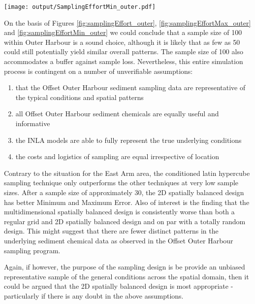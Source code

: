 \documentclass[a4paper]{article}
\let\origfigure=\figure
\let\endorigfigure=\endfigure
\renewenvironment{figure}[1][]{%
   \origfigure[H]
}{%
   \endorigfigure
}
\begin{document}
\begin{figure}
\centering\scriptsize\scriptsize
\texttt{[image: output/SamplingEffortMin\_outer.pdf]}
\caption{Comparison of the minimum Error conditional on sample size and
sampling method for the Outer
Harbour\label{fig:samplingEffortMin_outer}}
\end{figure}

On the basis of Figures \ref{fig:samplingEffort_outer},
\ref{fig:samplingEffortMax_outer} and \ref{fig:samplingEffortMin_outer}
we could conclude that a sample size of 100 within Outer Harbour is a
sound choice, although it is likely that as few as 50 could still
potentially yield similar overall patterns. The sample size of 100 also
accommodates a buffer against sample loss. Nevertheless, this entire
simulation process is contingent on a number of unverifiable
assumptions:

\begin{enumerate}
\def\labelenumi{\arabic{enumi}.}
\tightlist
\item
  that the Offset Outer Harbour sediment sampling data are
  representative of the typical conditions and spatial patterns
\item
  all Offset Outer Harbour sediment chemicals are equally useful and
  informative
\item
  the INLA models are able to fully represent the true underlying
  conditions
\item
  the costs and logistics of sampling are equal irrespective of location
\end{enumerate}

Contrary to the situation for the East Arm area, the conditioned latin
hypercube sampling technique only outperforms the other techniques at
very low sample sizes. After a sample size of approximately 30, the 2D
spatially balanced design has better Minimum and Maximum Error. Also of
interest is the finding that the multidimensional spatially balanced
design is consistently worse than both a regular grid and 2D spatially
balanced design and on par with a totally random design. This might
suggest that there are fewer distinct patterns in the underlying
sediment chemical data as observed in the Offset Outer Harbour sampling
program.

Again, if however, the purpose of the sampling design is be provide an
unbiased representative sample of the general conditions across the
spatial domain, then it could be argued that the 2D spatially balanced
design is most appropriate - particularly if there is any doubt in the
above assumptions.
\end{document}
